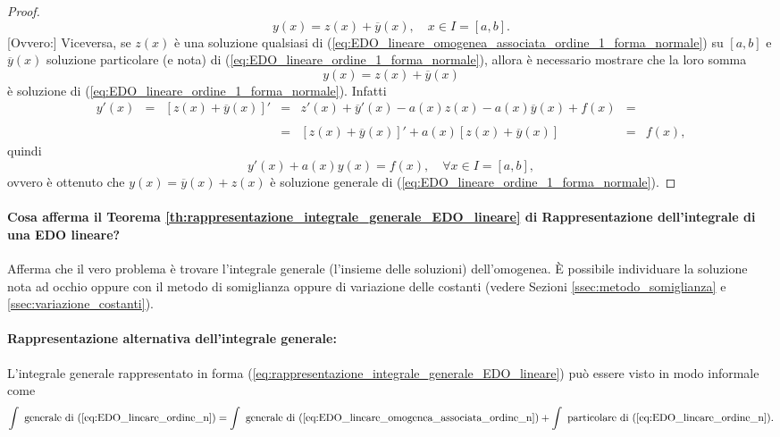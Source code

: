 \begin{proof}
    \begin{equation}\label{eq:da_verificare}
        y(x)=z(x)+\overline{y}(x),\quad x\in I=[a,b].
    \end{equation}
    [Ovvero:] Viceversa, se $z(x)$ è una soluzione qualsiasi di (\ref{eq:EDO_lineare_omogenea_associata_ordine_1_forma_normale}) su $[a,b]$ e $\overline{y}(x)$ soluzione particolare (e nota) di (\ref{eq:EDO_lineare_ordine_1_forma_normale}), allora è necessario mostrare che la loro somma
    \begin{equation*}
        y(x)=z(x)+\overline{y}(x)
    \end{equation*}
    è soluzione di (\ref{eq:EDO_lineare_ordine_1_forma_normale}). Infatti
    \begin{equation*}
        \begin{matrix}
            y'(x)&=&[z(x)+\overline{y}(x)]'&=&z'(x)+\overline{y}'(x)-a(x)z(x)-a(x)\overline{y}(x)+f(x) &=& \\\\
            &&&=&[z(x)+\overline{y}(x)]'+a(x)[z(x)+\overline{y}(x)]&=&f(x),
        \end{matrix}
    \end{equation*}
    quindi
    \begin{equation*}
        y'(x)+a(x)y(x)=f(x),\quad \forall x\in I=[a,b],
    \end{equation*}
    ovvero è ottenuto che $y(x)=\overline{y}(x)+z(x)$ è soluzione generale di (\ref{eq:EDO_lineare_ordine_1_forma_normale}).
\end{proof}

\paragraph{Cosa afferma il Teorema \ref{th:rappresentazione_integrale_generale_EDO_lineare} di Rappresentazione dell'integrale di una EDO lineare?} Afferma che il vero problema è trovare l'integrale generale (l'insieme delle soluzioni) dell'omogenea. È possibile individuare la soluzione nota ad occhio oppure con il metodo di somiglianza oppure di variazione delle costanti (vedere Sezioni \ref{ssec:metodo_somiglianza} e \ref{ssec:variazione_costanti}).

\paragraph{Rappresentazione alternativa dell'integrale generale:} L'integrale generale rappresentato in forma (\ref{eq:rappresentazione_integrale_generale_EDO_lineare}) può essere visto in modo informale come
\begin{equation*}
\int \text{ generale di (\ref{eq:EDO_lineare_ordine_n})}=\int{\text{ generale di (\ref{eq:EDO_lineare_omogenea_associata_ordine_n})}} + \int\text{ particolare di (\ref{eq:EDO_lineare_ordine_n})}.
\end{equation*}

